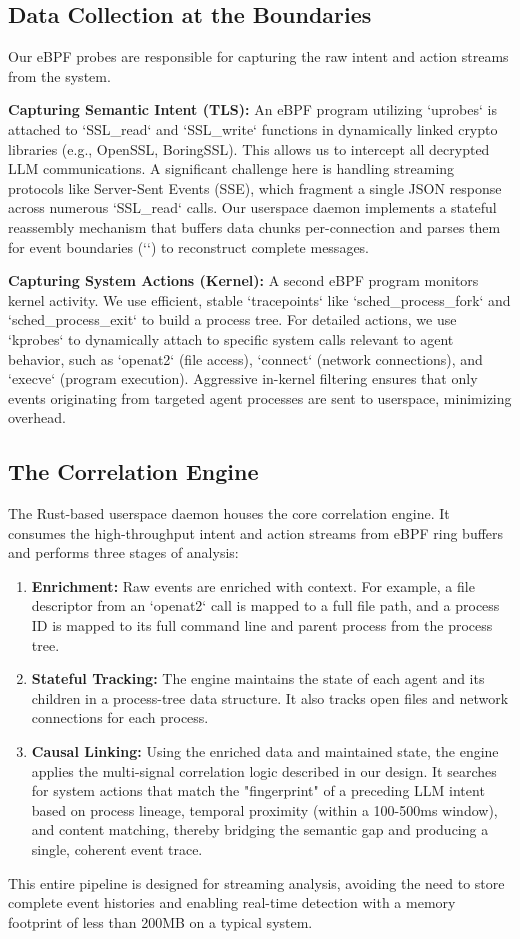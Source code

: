 \subsection{Data Collection at the Boundaries}
Our eBPF probes are responsible for capturing the raw intent and action streams from the system.

\textbf{Capturing Semantic Intent (TLS):} An eBPF program utilizing `uprobes` is attached to `SSL_read` and `SSL_write` functions in dynamically linked crypto libraries (e.g., OpenSSL, BoringSSL). This allows us to intercept all decrypted LLM communications. A significant challenge here is handling streaming protocols like Server-Sent Events (SSE), which fragment a single JSON response across numerous `SSL_read` calls. Our userspace daemon implements a stateful reassembly mechanism that buffers data chunks per-connection and parses them for event boundaries (`\n\n`) to reconstruct complete messages.

\textbf{Capturing System Actions (Kernel):} A second eBPF program monitors kernel activity. We use efficient, stable `tracepoints` like `sched_process_fork` and `sched_process_exit` to build a process tree. For detailed actions, we use `kprobes` to dynamically attach to specific system calls relevant to agent behavior, such as `openat2` (file access), `connect` (network connections), and `execve` (program execution). Aggressive in-kernel filtering ensures that only events originating from targeted agent processes are sent to userspace, minimizing overhead.

\subsection{The Correlation Engine}
The Rust-based userspace daemon houses the core correlation engine. It consumes the high-throughput intent and action streams from eBPF ring buffers and performs three stages of analysis:

\begin{enumerate}
    \item \textbf{Enrichment:} Raw events are enriched with context. For example, a file descriptor from an `openat2` call is mapped to a full file path, and a process ID is mapped to its full command line and parent process from the process tree.
    \item \textbf{Stateful Tracking:} The engine maintains the state of each agent and its children in a process-tree data structure. It also tracks open files and network connections for each process.
    \item \textbf{Causal Linking:} Using the enriched data and maintained state, the engine applies the multi-signal correlation logic described in our design. It searches for system actions that match the "fingerprint" of a preceding LLM intent based on process lineage, temporal proximity (within a 100-500ms window), and content matching, thereby bridging the semantic gap and producing a single, coherent event trace.
\end{enumerate}
This entire pipeline is designed for streaming analysis, avoiding the need to store complete event histories and enabling real-time detection with a memory footprint of less than 200MB on a typical system. 